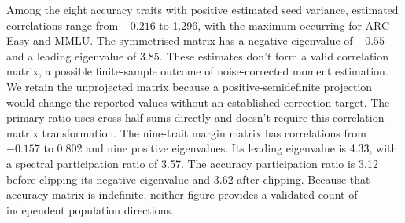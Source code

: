 Among the eight accuracy traits with positive estimated seed variance, estimated correlations range from $-0.216$ to 1.296, with the maximum occurring for ARC-Easy and MMLU. The symmetrised matrix has a negative eigenvalue of $-0.55$ and a leading eigenvalue of 3.85. These estimates don't form a valid correlation matrix, a possible finite-sample outcome of noise-corrected moment estimation. We retain the unprojected matrix because a positive-semidefinite projection would change the reported values without an established correction target. The primary ratio uses cross-half sums directly and doesn't require this correlation-matrix transformation. The nine-trait margin matrix has correlations from $-0.157$ to 0.802 and nine positive eigenvalues. Its leading eigenvalue is 4.33, with a spectral participation ratio of 3.57. The accuracy participation ratio is 3.12 before clipping its negative eigenvalue and 3.62 after clipping. Because that accuracy matrix is indefinite, neither figure provides a validated count of independent population directions.

